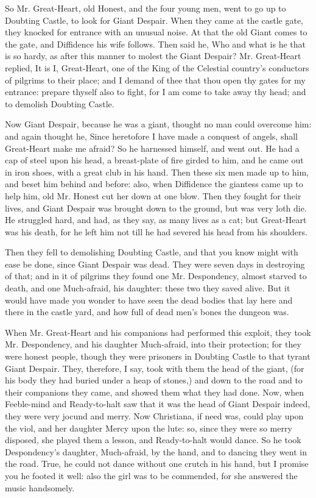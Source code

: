 So Mr. Great-Heart, old Honest, and the four young men, went to go up to Doubting Castle, to look for Giant Despair. When they came at the castle gate, they knocked for entrance with an unusual noise. At that the old Giant comes to the gate, and Diffidence his wife follows. Then said he, Who and what is he that is so hardy, as after this manner to molest the Giant Despair? Mr. Great-Heart replied, It is I, Great-Heart, one of the King of the Celestial country's conductors of pilgrims to their place; and I demand of thee that thou open thy gates for my entrance: prepare thyself also to fight, for I am come to take away thy head; and to demolish Doubting Castle.

Now Giant Despair, because he was a giant, thought no man could overcome him: and again thought he, Since heretofore I have made a conquest of angels, shall Great-Heart make me afraid? So he harnessed himself, and went out. He had a cap of steel upon his head, a breast-plate of fire girded to him, and he came out in iron shoes, with a great club in his hand. Then these six men made up to him, and beset him behind and before: also, when Diffidence the giantess came up to help him, old Mr. Honest cut her down at one blow. Then they fought for their lives, and Giant Despair was brought down to the ground, but was very loth die. He struggled hard, and had, as they say, as many lives as a cat; but Great-Heart was his death, for he left him not till he had severed his head from his shoulders.

Then they fell to demolishing Doubting Castle, and that you know might with ease be done, since Giant Despair was dead. They were seven days in destroying of that; and in it of pilgrims they found one Mr. Despondency, almost starved to death, and one Much-afraid, his daughter: these two they saved alive. But it would have made you wonder to have seen the dead bodies that lay here and there in the castle yard, and how full of dead men's bones the dungeon was.

When Mr. Great-Heart and his companions had performed this exploit, they took Mr. Despondency, and his daughter Much-afraid, into their protection; for they were honest people, though they were prisoners in Doubting Castle to that tyrant Giant Despair. They, therefore, I say, took with them the head of the giant, (for his body they had buried under a heap of stones,) and down to the road and to their companions they came, and showed them what they had done. Now, when Feeble-mind and Ready-to-halt saw that it was the head of Giant Despair indeed, they were very jocund and merry. Now Christiana, if need was, could play upon the viol, and her daughter Mercy upon the lute: so, since they were so merry disposed, she played them a lesson, and Ready-to-halt would dance. So he took Despondency's daughter, Much-afraid, by the hand, and to dancing they went in the road. True, he could not dance without one crutch in his hand, but I promise you he footed it well: also the girl was to be commended, for she answered the music handsomely.

